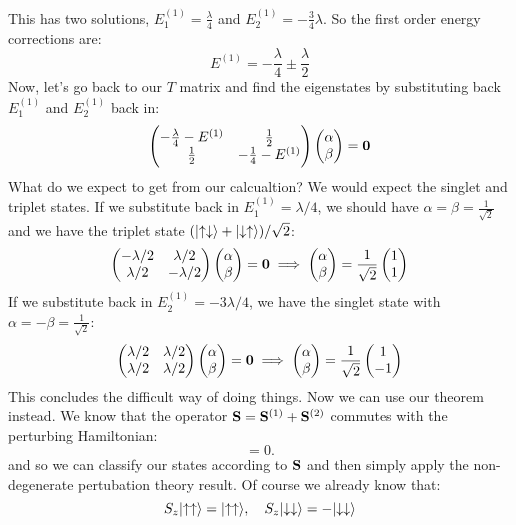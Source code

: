 This has two solutions, $E^{(1)}_1 = \frac{\lambda}{4}$ and $E^{(1)}_2 = -\frac{3}{4}\lambda$. So the first order energy corrections are:
\begin{equation}
    E^{(1)} = -\frac{\lambda}{4} \pm \frac{\lambda}{2}
\end{equation}
Now, let's go back to our $T$ matrix and find the eigenstates by substituting back $E^{(1)}_1$ and $E^{(1)}_2$ back in:
\begin{equation}
    \begin{pmatrix}-\frac{\lambda}{4} - E^{(1)} & \frac{1}{2} \\ \frac{1}{2} & -\frac{1}{4} - E^{(1)}\end{pmatrix}\begin{pmatrix}\alpha\\\beta\end{pmatrix} = \mathbf{0}
\end{equation}
What do we expect to get from our calcualtion? We would expect the singlet and triplet states. If we substitute back in $E^{(1)}_1 = \lambda/4$, we should have $\alpha = \beta = \frac{1}{\sqrt{2}}$ and we have the triplet state $(\lvert \uparrow\downarrow \rangle + \lvert \downarrow\uparrow \rangle)/\sqrt{2}$:
\begin{equation}
    \begin{pmatrix}-\lambda/2 & \lambda/2 \\ \lambda/2 & -\lambda/2\end{pmatrix}\begin{pmatrix}\alpha\\\beta\end{pmatrix} = \mathbf{0} \implies \begin{pmatrix}\alpha\\\beta\end{pmatrix} = \frac{1}{\sqrt{2}}\begin{pmatrix}1\\1\end{pmatrix}
\end{equation}
If we substitute back in $E^{(1)}_2 = -3\lambda/4$, we have the singlet state with $\alpha = -\beta = \frac{1}{\sqrt{2}}$:
\begin{equation}
    \begin{pmatrix}\lambda/2 & \lambda/2 \\ \lambda/2 & \lambda/2\end{pmatrix}\begin{pmatrix}\alpha\\\beta\end{pmatrix} = \mathbf{0} \implies \begin{pmatrix}\alpha\\\beta\end{pmatrix} = \frac{1}{\sqrt{2}}\begin{pmatrix}1\\-1\end{pmatrix}
\end{equation}
This concludes the difficult way of doing things. Now we can use our theorem instead. We know that the operator $\mathbf{S} = \mathbf{S}^{(1)} + \mathbf{S}^{(2)}$ commutes with the perturbing Hamiltonian:
\begin{equation}
    [\v{S}^{(1)} + \v{S}^{(2)}, \lambda\v{S}^{(1)} \cdot \v{S}^{(2)}] = 0.
\end{equation}
and so we can classify our states according to $\mathbf{S}$ and then simply apply the non-degenerate pertubation theory result. Of course we already know that:
\begin{equation}
    S_z\lvert \uparrow\uparrow \rangle = \lvert \uparrow\uparrow \rangle, \quad S_z\lvert \downarrow\downarrow \rangle = -\lvert \downarrow\downarrow \rangle
\end{equation}
